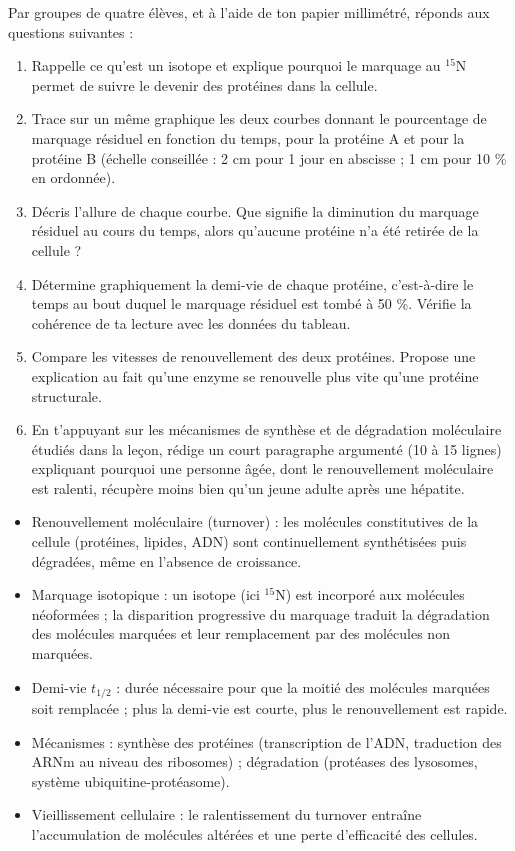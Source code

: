 \documentclass[11pt]{article}
\newcommand{\cle}[1]{{\popxbold\color{popdark}#1}}
\newcounter{popsec}
\newcounter{popsub}
\newcommand{\courssub}[1]{%
  \stepcounter{popsub}%
  \par\vspace{9pt}\noindent{\popxbold\fontsize{11.5}{13}\selectfont\color{popink}{\color{poporange}\thepopsec.\thepopsub}\hspace{6pt}#1}\par\nopagebreak\vspace{4pt}
}
\begin{document}
\courssub{Consignes}

Par groupes de quatre élèves, et à l'aide de ton papier millimétré, réponds aux questions suivantes :

\begin{enumerate}
\item Rappelle ce qu'est un \cle{isotope} et explique pourquoi le marquage au $^{15}$N permet de suivre le devenir des protéines dans la cellule.
\item Trace sur un même graphique les deux courbes donnant le pourcentage de marquage résiduel en fonction du temps, pour la protéine A et pour la protéine B (échelle conseillée : 2 cm pour 1 jour en abscisse ; 1 cm pour 10 \% en ordonnée).
\item Décris l'allure de chaque courbe. Que signifie la diminution du marquage résiduel au cours du temps, alors qu'aucune protéine n'a été retirée de la cellule ?
\item Détermine graphiquement la \cle{demi-vie} de chaque protéine, c'est-à-dire le temps au bout duquel le marquage résiduel est tombé à 50 \%. Vérifie la cohérence de ta lecture avec les données du tableau.
\item Compare les vitesses de renouvellement des deux protéines. Propose une explication au fait qu'une enzyme se renouvelle plus vite qu'une protéine structurale.
\item En t'appuyant sur les mécanismes de synthèse et de dégradation moléculaire étudiés dans la leçon, rédige un court paragraphe argumenté (10 à 15 lignes) expliquant pourquoi une personne âgée, dont le renouvellement moléculaire est ralenti, récupère moins bien qu'un jeune adulte après une hépatite.
\end{enumerate}

\courssub{Ressources à mobiliser}

\begin{aretenir}
\begin{itemize}
\item \cle{Renouvellement moléculaire} (turnover) : les molécules constitutives de la cellule (protéines, lipides, ADN) sont continuellement synthétisées puis dégradées, même en l'absence de croissance.
\item \cle{Marquage isotopique} : un isotope (ici $^{15}$N) est incorporé aux molécules néoformées ; la disparition progressive du marquage traduit la dégradation des molécules marquées et leur remplacement par des molécules non marquées.
\item \cle{Demi-vie} $t_{1/2}$ : durée nécessaire pour que la moitié des molécules marquées soit remplacée ; plus la demi-vie est courte, plus le renouvellement est rapide.
\item \cle{Mécanismes} : synthèse des protéines (transcription de l'ADN, traduction des ARNm au niveau des ribosomes) ; dégradation (protéases des lysosomes, système ubiquitine-protéasome).
\item \cle{Vieillissement cellulaire} : le ralentissement du turnover entraîne l'accumulation de molécules altérées et une perte d'efficacité des cellules.
\end{itemize}
\end{aretenir}
\end{document}
